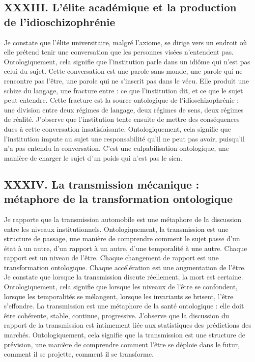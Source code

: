 \documentclass[12pt,a4paper]{article}
\begin{document}
\subsection*{XXXIII. L’élite académique et la production de l’idioschizophrénie}
Je constate que l’élite universitaire, malgré l’axiome, se dirige vers un endroit où elle prétend tenir une conversation que les personnes visées n’entendent pas. Ontologiquement, cela signifie que l’institution parle dans un idiôme qui n’est pas celui du sujet.
Cette conversation est une parole sans monde, une parole qui ne rencontre pas l’être, une parole qui ne s’inscrit pas dans le vécu.
Elle produit une schize du langage, une fracture entre :
	ce que l’institution dit,
	et ce que le sujet peut entendre.
Cette fracture est la source ontologique de l’idioschizophrénie : une division entre deux régimes de langage, deux régimes de sens, deux régimes de réalité.
J’observe que l’institution tente ensuite de mettre des conséquences dues à cette conversation insatisfaisante. Ontologiquement, cela signifie que l’institution impute au sujet une responsabilité qu’il ne peut pas avoir, puisqu’il n’a pas entendu la conversation.
C’est une culpabilisation ontologique, une manière de charger le sujet d’un poids qui n’est pas le sien.

\subsection*{XXXIV. La transmission mécanique : métaphore de la transformation ontologique}
Je rapporte que la transmission automobile est une métaphore de la discussion entre les niveaux institutionnels. Ontologiquement, la transmission est une structure de passage, une manière de comprendre comment le sujet passe d’un état à un autre, d’un rapport à un autre, d’une temporalité à une autre.
Chaque rapport est un niveau de l’être. Chaque changement de rapport est une transformation ontologique. Chaque accélération est une augmentation de l’être.
Je constate que lorsque la transmission discute réellement, la mort est certaine. Ontologiquement, cela signifie que lorsque les niveaux de l’être se confondent, lorsque les temporalités se mélangent, lorsque les invariants se brisent, l’être s’effondre.
La transmission est une métaphore de la santé ontologique : elle doit être cohérente, stable, continue, progressive.
J’observe que la discussion du rapport de la transmission est intimement liée aux statistiques des prédictions des marchés. Ontologiquement, cela signifie que la transmission est une structure de prévision, une manière de comprendre comment l’être se déploie dans le futur, comment il se projette, comment il se transforme.
\end{document}
